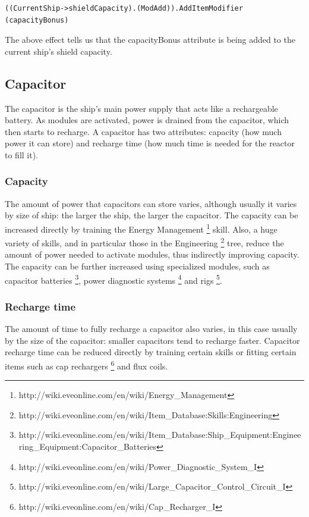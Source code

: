 \begin{lstlisting}[caption=Another example of a dogma expression]
((CurrentShip->shieldCapacity).(ModAdd)).AddItemModifier (capacityBonus)
\end{lstlisting}

The above effect tells us that the capacityBonus attribute is being added to the current ship’s shield capacity.

\subsection{Capacitor}
The capacitor is the ship’s main power supply that acts like a rechargeable battery. As modules are activated, power is drained from the capacitor, which then starts to recharge. A capacitor has two attributes: capacity (how much power it can store) and recharge time (how much time is needed for the reactor to fill it).

\subsubsection{Capacity}
The amount of power that capacitors can store varies, although usually it varies by size of ship: the larger the ship, the larger the capacitor. The capacity can be increased directly by training the Energy Management \footnote{http://wiki.eveonline.com/en/wiki/Energy_Management} skill. Also, a huge variety of skills, and in particular those in the Engineering \footnote{http://wiki.eveonline.com/en/wiki/Item_Database:Skills:Engineering} tree, reduce the amount of power needed to activate modules, thus indirectly improving capacity. The capacity can be further increased using specialized modules, such as capacitor batteries \footnote{http://wiki.eveonline.com/en/wiki/Item_Database:Ship_Equipment:Engineering_Equipment:Capacitor_Batteries}, power diagnostic systems \footnote{http://wiki.eveonline.com/en/wiki/Power_Diagnostic_System_I} and rigs \footnote{http://wiki.eveonline.com/en/wiki/Large_Capacitor_Control_Circuit_I}.

\subsubsection{Recharge time}
The amount of time to fully recharge a capacitor also varies, in this case usually by the size of the capacitor: smaller capacitors tend to recharge faster. Capacitor recharge time can be reduced directly by training certain skills or fitting certain items such as cap rechargers \footnote{http://wiki.eveonline.com/en/wiki/Cap_Recharger_I} and flux coils. 

